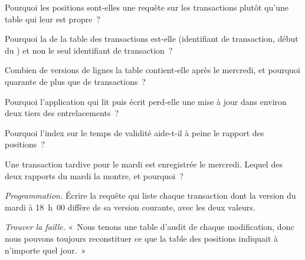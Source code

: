 \begin{exercise}[$\star$]\label{exo:pl:databases-and-sql:1}
Pourquoi les positions sont-elles une requête sur les transactions plutôt qu'une table qui leur est propre~?
\end{exercise}

\begin{exercise}[$\star$]\label{exo:pl:databases-and-sql:2}
Pourquoi la  de la table des transactions est-elle (identifiant de transaction, début du ) et non le seul identifiant de transaction~?
\end{exercise}

\begin{exercise}[$\star$]\label{exo:pl:databases-and-sql:3}
Combien de versions de lignes la table contient-elle après le mercredi, et pourquoi quarante de plus que de transactions~?
\end{exercise}

\begin{exercise}[$\star\star$]\label{exo:pl:databases-and-sql:4}
Pourquoi l'application qui lit puis écrit perd-elle une mise à jour dans environ deux tiers des entrelacements~?
\end{exercise}

\begin{exercise}[$\star\star$]\label{exo:pl:databases-and-sql:5}
Pourquoi l'index sur le temps de validité aide-t-il à peine le rapport des positions~?
\end{exercise}

\begin{exercise}[$\star\star$]\label{exo:pl:databases-and-sql:6}
Une transaction tardive pour le mardi est enregistrée le mercredi. Lequel des deux rapports du mardi la montre, et pourquoi~?
\end{exercise}

\begin{exercise}[$\star\star\star$]\label{exo:pl:databases-and-sql:7}
\emph{Programmation.} Écrire la requête qui liste chaque transaction dont la version du mardi à 18~h~00 diffère de sa version courante, avec les deux valeurs.
\end{exercise}

\begin{exercise}[$\star\star\star$]\label{exo:pl:databases-and-sql:8}
\emph{Trouver la faille.} «~Nous tenons une table d'audit de chaque modification, donc nous pouvons toujours reconstituer ce que la table des positions indiquait à n'importe quel
jour.~»
\end{exercise}

